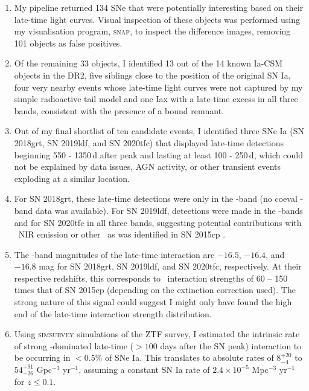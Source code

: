 \documentclass[a4paper,oneside,12pt, class=Latex/Classes/PhDthesisPSnPDF, crop=false]{standalone}
\begin{document}
\begin{enumerate}
 \item My pipeline returned 134 SNe that were potentially interesting based on their late-time light curves. Visual inspection of these objects was performed using my visualisation program, \textsc{snap}, to inspect the difference images, removing 101 objects as false positives.\\
 \item Of the remaining 33 objects, I identified 13 out of the 14 known Ia-CSM objects in the DR2, five siblings close to the position of the original SN Ia, four very nearby events whose late-time light curves were not captured by my simple radioactive tail model and one Iax with a late-time excess in all three bands, consistent with the presence of a bound remnant.
 \item Out of my final shortlist of ten candidate events, I identified three SNe Ia (SN 2018grt, SN 2019ldf, and SN 2020tfc) that displayed late-time detections beginning 550 - 1350\,d after peak and lasting at least 100 - 250\,d, which could not be explained by data issues, AGN activity, or other transient events exploding at a similar location.
 \item For SN 2018grt, these late-time detections were only in the \ztfr-band (no coeval \ztfi-band data was available). For SN 2019ldf, detections were made in the \ztfr\ztfi-bands and for SN 2020tfc in all three bands, suggesting potential contributions with \CaII\ NIR emission or other \MgI\ as was identified in SN 2015cp \citep{2015cp}.
 \item The \ztfr-band magnitudes of the late-time interaction are $-16.5$, $-16.4$, and $-16.8$ mag for SN 2018grt, SN 2019ldf, and SN 2020tfc, respectively. At their respective redshifts, this corresponds to \Halpha~interaction strengths of 60 -- 150 times that of SN 2015cp (depending on the extinction correction used). The strong nature of this signal could suggest I might only have found the high end of the late-time interaction strength distribution.
 \item Using \textsc{simsurvey} simulations of the ZTF survey, I estimated the intrinsic rate of strong \Halpha-dominated late-time ($>100$ days after the SN peak) interaction to be occurring in $<$0.5\% of SNe Ia. This translates to absolute rates of $8_{-4}^{+20}$ to $54_{-26}^{+91}$ Gpc$^{-3}$ yr$^{-1}$, assuming a constant SN Ia rate of $2.4\times10^{-5}$ Mpc$^{-3}$ yr$^{-1}$ for $z \leq 0.1$.\\ \\
\end{enumerate}
\end{document}
